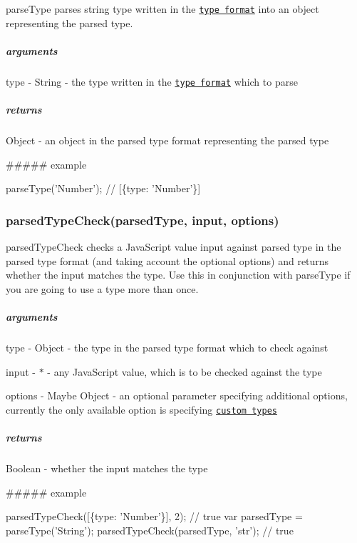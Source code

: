 {\ttfamily parse\+Type} parses string {\ttfamily type} written in the \href{#type-format}{\tt type format} into an object representing the parsed type.

\subparagraph*{arguments}


\begin{DoxyItemize}
\item type -\/ {\ttfamily String} -\/ the type written in the \href{#type-format}{\tt type format} which to parse
\end{DoxyItemize}

\subparagraph*{returns}

{\ttfamily Object} -\/ an object in the parsed type format representing the parsed type

\#\#\#\#\# example 
\begin{DoxyCode}
parseType('Number'); // [\{type: 'Number'\}]
\end{DoxyCode}
 \subsubsection*{parsed\+Type\+Check(parsed\+Type, input, options)}

{\ttfamily parsed\+Type\+Check} checks a Java\+Script value {\ttfamily input} against parsed {\ttfamily type} in the parsed type format (and taking account the optional {\ttfamily options}) and returns whether the {\ttfamily input} matches the {\ttfamily type}. Use this in conjunction with {\ttfamily parse\+Type} if you are going to use a type more than once.

\subparagraph*{arguments}


\begin{DoxyItemize}
\item type -\/ {\ttfamily Object} -\/ the type in the parsed type format which to check against
\item input -\/ {\ttfamily $\ast$} -\/ any Java\+Script value, which is to be checked against the type
\item options -\/ {\ttfamily Maybe Object} -\/ an optional parameter specifying additional options, currently the only available option is specifying \href{#custom-types}{\tt custom types}
\end{DoxyItemize}

\subparagraph*{returns}

{\ttfamily Boolean} -\/ whether the input matches the type

\#\#\#\#\# example 
\begin{DoxyCode}
parsedTypeCheck([\{type: 'Number'\}], 2); // true
var parsedType = parseType('String');
parsedTypeCheck(parsedType, 'str');     // true
\end{DoxyCode}


